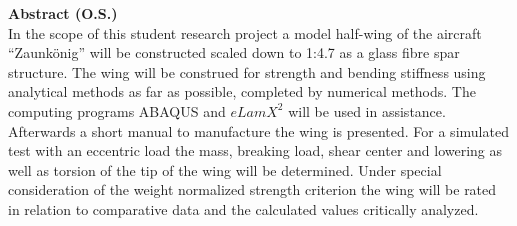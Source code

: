 

\noindent\large{\textbf{Abstract (O.S.)}}~\\

\noindent In the scope of this student research project a model half-wing of the aircraft “Zaunkönig” will be constructed scaled down to 1:4.7 as a glass fibre spar structure. The wing will be construed for strength and bending stiffness using analytical methods as far as possible, completed by numerical methods. The computing programs ABAQUS and $ eLamX^{2} $ will be used in assistance. Afterwards a short manual to manufacture the wing is presented. For a simulated test with an eccentric load the mass, breaking load, shear center and lowering as well as torsion of the tip of the wing will be determined. Under special consideration of the weight normalized strength criterion the wing will be rated in relation to comparative data and the calculated values critically analyzed.
